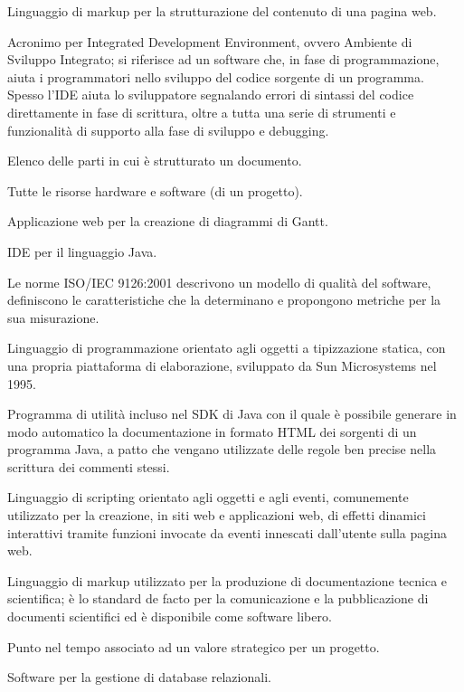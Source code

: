 \item[HTML5] Linguaggio di markup per la strutturazione del contenuto di una pagina web.
\item[IDE]  Acronimo per Integrated Development Environment, ovvero Ambiente di Sviluppo Integrato; si riferisce ad un software che, in fase di programmazione, aiuta i programmatori nello sviluppo del codice sorgente di un programma. Spesso l'IDE aiuta lo sviluppatore segnalando errori di sintassi del codice direttamente in fase di scrittura, oltre a tutta una serie di strumenti e funzionalità di supporto alla fase di sviluppo e debugging.
\item[Indice generale] Elenco delle parti in cui è strutturato un documento.
\item[Infrastruttura] Tutte le risorse hardware e software (di un progetto).
\item[Instagantt] Applicazione web per la creazione di diagrammi di Gantt.
\item[IntelliJ Idea] IDE per il linguaggio Java.
\item[ISO/IEC 9126:2001] Le norme ISO/IEC 9126:2001 descrivono un modello di qualità del software, definiscono le caratteristiche che la determinano e propongono metriche per la sua misurazione.
\item[Java] Linguaggio di programmazione orientato agli oggetti a tipizzazione statica, con una propria piattaforma di elaborazione, sviluppato da Sun Microsystems nel 1995.
\item[Javadoc] Programma di utilità incluso nel SDK di Java con il quale è possibile generare in modo automatico la documentazione in formato HTML dei sorgenti di un programma Java, a patto che vengano utilizzate delle regole ben precise nella scrittura dei commenti stessi.
\item[JavaScript] Linguaggio di scripting orientato agli oggetti e agli eventi, comunemente utilizzato per la creazione, in siti web e applicazioni web, di effetti dinamici interattivi tramite funzioni invocate da eventi innescati dall’utente sulla pagina web.
\item[Latex] Linguaggio di markup utilizzato per la produzione di documentazione tecnica e scientifica; è lo standard de facto per la comunicazione e la pubblicazione di documenti scientifici ed è disponibile come software libero.
\item[Milestone] Punto nel tempo associato ad un valore strategico per un progetto.
\item[MySQL] Software per la gestione di database relazionali.
